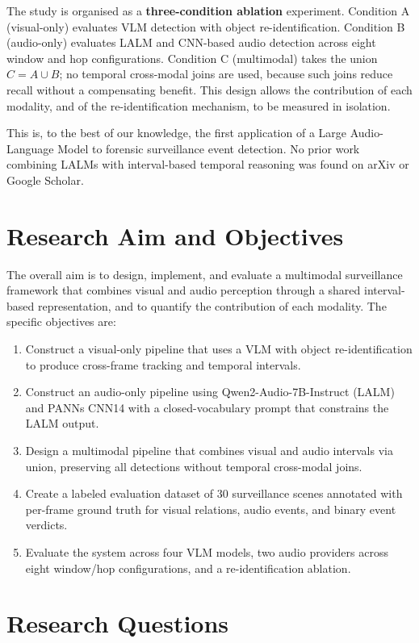 The study is organised as a \textbf{three-condition ablation} experiment. Condition A (visual-only) evaluates VLM detection with object re-identification. Condition B (audio-only) evaluates LALM and CNN-based audio detection across eight window and hop configurations. Condition C (multimodal) takes the union $C = A \cup B$; no temporal cross-modal joins are used, because such joins reduce recall without a compensating benefit. This design allows the contribution of each modality, and of the re-identification mechanism, to be measured in isolation.

This is, to the best of our knowledge, the first application of a Large Audio-Language Model to forensic surveillance event detection. No prior work combining LALMs with interval-based temporal reasoning was found on arXiv or Google Scholar.

\section{Research Aim and Objectives}

The overall aim is to design, implement, and evaluate a multimodal surveillance framework that combines visual and audio perception through a shared interval-based representation, and to quantify the contribution of each modality. The specific objectives are:

\begin{enumerate}
  \item Construct a visual-only pipeline that uses a VLM with object re-identification to produce cross-frame tracking and temporal intervals.
  \item Construct an audio-only pipeline using Qwen2-Audio-7B-Instruct (LALM) and PANNs CNN14 with a closed-vocabulary prompt that constrains the LALM output.
  \item Design a multimodal pipeline that combines visual and audio intervals via union, preserving all detections without temporal cross-modal joins.
  \item Create a labeled evaluation dataset of 30 surveillance scenes annotated with per-frame ground truth for visual relations, audio events, and binary event verdicts.
  \item Evaluate the system across four VLM models, two audio providers across eight window/hop configurations, and a re-identification ablation.
\end{enumerate}

\section{Research Questions}

